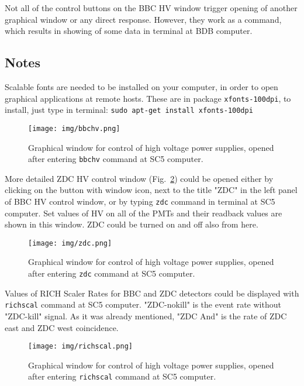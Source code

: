 Not all of the control buttons on the BBC HV window trigger opening of another graphical window or any direct response. However, they work as a command, which results in showing of some data in terminal at BDB computer.

\subsection{Notes}
Scalable fonts are needed to be installed on your computer, in order to open graphical applications at remote hosts.
These are in package \texttt{xfonts-100dpi}, to install, just type in terminal: \texttt{sudo apt-get install xfonts-100dpi}
 
\begin{figure}[htb]
  \begin{center}
    \texttt{[image: img/bbchv.png]}
  \end{center}
  \caption{Graphical window for control of high voltage power supplies, opened after entering \texttt{bbchv} command at SC5 computer.}
\label{bbchv}
\end{figure}

More detailed ZDC HV control window (Fig.~\ref{zdcwindow}) could be opened either by clicking on the button with window icon, next to the title "ZDC" in the left panel of BBC HV control window, or by typing \texttt{zdc} command in terminal at SC5 computer. Set values of HV on all of the PMTs and their readback values are shown in this window.  ZDC could be turned on and off also from here.

\begin{figure}[htb]
  \begin{center}
    \texttt{[image: img/zdc.png]}
  \end{center}
  \caption{Graphical window for control of high voltage power supplies, opened after entering \texttt{zdc} command at SC5 computer.}
\label{zdcwindow}
\end{figure}

Values of RICH Scaler Rates for BBC and ZDC detectors could be displayed with \texttt{richscal} command at SC5 computer. "ZDC-nokill" is the event rate without "ZDC-kill" signal. As it was already mentioned, "ZDC And" is the rate of ZDC east and ZDC west coincidence.

\begin{figure}[htb]
  \begin{center}
    \texttt{[image: img/richscal.png]}
  \end{center}
  \caption{Graphical window for control of high voltage power supplies, opened after entering \texttt{richscal} command at SC5 computer.}
\label{richscal}
\end{figure}

